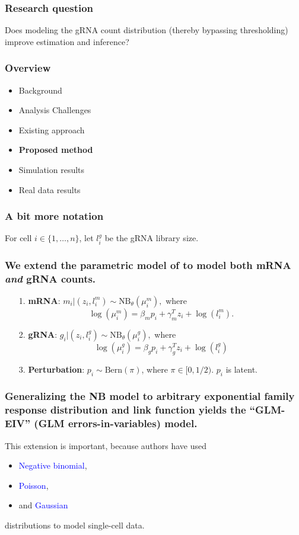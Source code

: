 \documentclass{beamer}
\begin{document}

\begin{frame}
\frametitle{Research question}
Does modeling the gRNA count distribution (thereby bypassing thresholding) improve estimation and inference?
\end{frame}


\begin{frame}
\frametitle{Overview}
\begin{itemize}
	\item Background
	\item Analysis Challenges
	\item Existing approach
	\item \textbf{Proposed method}
	\item Simulation results
	\item Real data results
\end{itemize}
\end{frame}


\begin{frame}
\frametitle{A bit more notation}
For cell $i \in \{ 1, \dots, n\}$, let $l^g_i$ be the gRNA library size.
\end{frame}

\begin{frame}
\frametitle{We extend the parametric model of \cite{Sarkar2021} to model both mRNA \textit{and} gRNA counts.}
\begin{itemize}
\item[1.] \textbf{mRNA}: $m_i | (z_i, l_i^m) \sim \textrm{NB}_\theta(\mu^m_i),$ where $$ \log\left( \mu^m_i \right) = \beta_m p_i + \gamma_m^T z_i + \log(l^m_i).$$
\item[2.] \textbf{gRNA}: $g_i | (z_i, l_i^g) \sim \textrm{NB}_\theta (\mu_i^g),$ where $$\log(\mu_i^g) = \beta_g p_i + \gamma_g^T z_i + \log(l_i^g)$$
\item[3.] \textbf{Perturbation}: $p_i \sim \textrm{Bern}(\pi)$, where $\pi \in [0, 1/2)$. $p_i$ is latent.
\end{itemize}
\end{frame}

\begin{frame}
\frametitle{Generalizing the NB model to arbitrary exponential family response distribution and link function yields the ``GLM-EIV'' (GLM errors-in-variables) model.}

This extension is important, because authors have used
 \begin{itemize}
 \item \textcolor{blue}{Negative binomial}, \cite{Choudhary2021}
 \item \textcolor{blue}{Poisson}, \cite{Schraivogel2020}
 \item and \textcolor{blue}{Gaussian} \cite{Lin2021}
 \end{itemize}
distributions to model single-cell data.
\end{frame}
\end{document}

